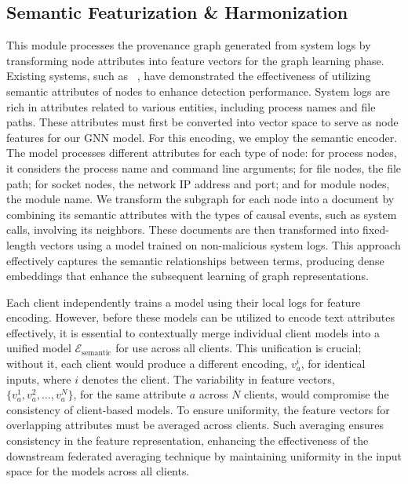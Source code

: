 
\subsection{Semantic Featurization \& Harmonization}
\label{semanfeat}


This module processes the provenance graph generated from system logs by transforming node attributes into feature vectors for the graph learning phase. Existing systems, such as \flash~\cite{flash2024}, have demonstrated the effectiveness of utilizing semantic attributes of nodes to enhance detection performance. System logs are rich in attributes related to various entities, including process names and file paths. These attributes must first be converted into vector space to serve as node features for our GNN model. For this encoding, we employ the \wordvec semantic encoder. The \wordvec model processes different attributes for each type of node: for process nodes, it considers the process name and command line arguments; for file nodes, the file path; for socket nodes, the network IP address and port; and for module nodes, the module name. We transform the subgraph for each node into a document by combining its semantic attributes with the types of causal events, such as system calls, involving its neighbors. These documents are then transformed into fixed-length vectors using a \wordvec model trained on non-malicious system logs. This approach effectively captures the semantic relationships between terms, producing dense embeddings that enhance the subsequent learning of graph representations.

 Each client independently trains a \wordvec model using their local logs for feature encoding. However, before these models can be utilized to encode text attributes effectively, it is essential to contextually merge individual client \wordvec models into a unified model \( \mathcal{E}_{\text{semantic}} \) for use across all clients. This unification is crucial; without it, each client would produce a different encoding, \(v_a^i\), for identical inputs, where \(i\) denotes the client. The variability in feature vectors, \(\{v_a^1, v_a^2, \ldots, v_a^N\}\), for the same attribute \(a\) across \(N\) clients, would compromise the consistency of client-based \gnnshort models. To ensure uniformity, the feature vectors for overlapping attributes must be averaged across clients. Such averaging ensures consistency in the feature representation, enhancing the effectiveness of the downstream federated averaging technique by maintaining uniformity in the input space for the \gnnshort models across all clients.

